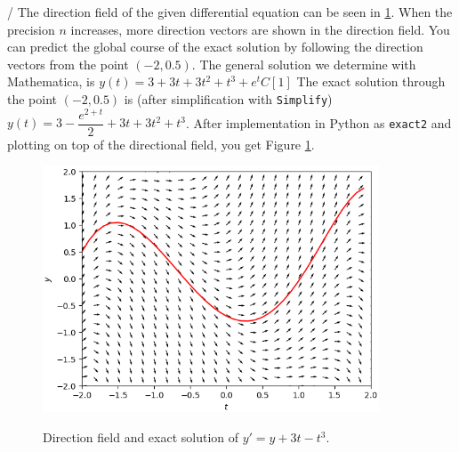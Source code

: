 \begin{Answer}\phantom{}
    	\Question /
    	\Question The direction field of the given differential equation can be seen in \ref{fig:oefening2_2}.
        \Question When the precision $n$ increases, more direction vectors are shown in the direction field.
        \Question You can predict the global course of the exact solution by following the direction vectors from the point $(-2,0.5)$.
        \Question The general solution we determine with Mathematica, is $y(t) = 3+3t+3t^2+t^3+e^tC[1]$
        \Question The exact solution through the point $(-2,0.5)$ is (after simplification with \texttt{Simplify}) \\ $y(t) = 3 - \dfrac{e^{2+t}}{2} + 3t + 3t^2 + t^3$. After implementation in Python as \texttt{exact2} and plotting on top of the directional field, you get Figure \ref{fig:oefening2_2}.

\begin{figure}[H]
	\centering				\includegraphics[width=10cm]{oefening2_2.png}\\
	\caption{Direction field and exact solution of $y' = y + 3t - t^3$.}
	\label{fig:oefening2_2}
\end{figure}

    \EndCurrentQuestion
\end{Answer}




